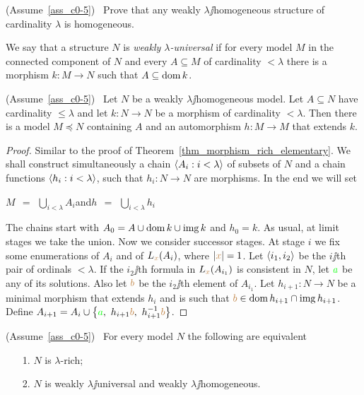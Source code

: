 \documentclass[creche.tex]{subfiles}
\begin{document}
\begin{exercise}\label{omogeneo=debolmenteaomogeneo}
(Assume~\ref{ass_c0-5}) \ Prove that any weakly $\lambda\jj$ho\-mo\-ge\-ne\-ous structure of cardinality $\lambda$ is homogeneous.\QED
\end{exercise}

\begin{definition}\label{def_weakly_universal}
We say that a structure $N$ is \emph{weakly $\lambda$-universal\/} if for every model $M$ in the connected component of $N$ and every $A\subseteq M$ of cardinality $<\lambda$ there is a morphism $k:M\to N$ such that $A\subseteq\mathop{\rm dom} k$.\QED
\end{definition}

\begin{lemma}\label{debolmenteomogeneoandirivieni}
(Assume~\ref{ass_c0-5})  \  Let $N$ be a weakly $\lambda\jj$ho\-mo\-ge\-ne\-ous model. Let $A\subseteq N$ have cardinality $\le\lambda$ and let $k:N\to N$ be a morphism of cardinality $<\lambda$. Then there is a model  $M\preceq N$ containing $A$ and an automorphism $h:M\to M$ that extends $k$.
\end{lemma}

\begin{proof}
Similar to the proof of Theorem~\ref{thm_morphism_rich_elementary}. We shall construct simultaneously a chain $\langle A_i:i<\lambda\rangle$ of subsets of $N$ and a chain functions $\langle h_i:i<\lambda\rangle$, such that $h_i:N\to N$ are morphisms. In the end we will set

\hfil $\displaystyle M\ \ =\ \ \bigcup_{i<\lambda}A_i$\hfil  and\hfil  $\displaystyle h\ \ =\ \ \bigcup_{i<\lambda}h_i$ 

The chains start with $A_0=A\cup\mathop{\rm dom} k\cup\mathop{\rm img} k$ and $h_0=k$. As usual, at limit stages we take the union. Now we consider successor stages. At stage $i$ we fix some enumerations of $A_i$ and of $L_{\color{brown} x}(A_i)$, where $|{\color{brown} x}|=1$. Let $\langle i_1,i_2\rangle$ be the $i\jj$th pair of ordinals $<\lambda$. If the $i_2\jj$th formula in $L_{\color{brown} x}(A_{i_1})$ is consistent in $N$, let ${\color{green} a}$ be any of its solutions. Also let ${\color{brown} b}$ be the $i_2\jj$th element of $A_{i_1}$. Let $h_{i+1}:N\to N$ be a minimal morphism that extends $h_i$ and is such that ${\color{brown} b}\in\mathop{\rm dom} h_{i+1}\cap\mathop{\rm img} h_{i+1}$. Define $A_{i+1}=A_i\cup\big\{{\color{green} a},\ h_{i+1}{\color{brown} b},\  h_{i+1}^{-1}{\color{brown} b}\big\}$.
\end{proof}

\begin{theorem}\label{ricco=universaledebolmenteomogeneo}
(Assume~\ref{ass_c0-5})  \  For every model $N$ the following are equivalent
\begin{itemize}
\item[1.] $N$ is $\lambda$-rich;
\item[2.] $N$ is  weakly $\lambda\jj$universal and weakly $\lambda\jj$homogeneous.
\end{itemize}
\end{theorem}
\end{document}

